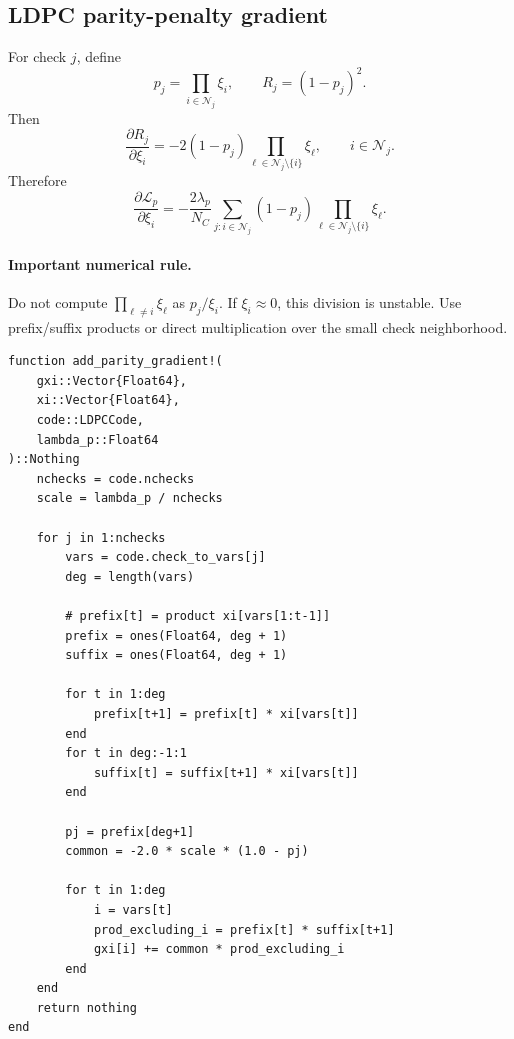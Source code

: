 \documentclass[11pt]{article}
\begin{document}
\subsection{LDPC parity-penalty gradient}

For check $j$, define
\begin{equation}
 p_j=\prod_{i\in\mathcal N_j}\xi_i,
\qquad
R_j=(1-p_j)^2.
\end{equation}
Then
\begin{equation}
\frac{\partial R_j}{\partial\xi_i}
= -2(1-p_j)\prod_{\ell\in\mathcal N_j\setminus\{i\}}\xi_\ell,
\qquad i\in\mathcal N_j.
\end{equation}
Therefore
\begin{equation}
\frac{\partial\mathcal L_p}{\partial\xi_i}
= -\frac{2\lambda_p}{N_C}
\sum_{j:i\in\mathcal N_j}
(1-p_j)
\prod_{\ell\in\mathcal N_j\setminus\{i\}}\xi_\ell.
\label{eq:grad_parity}
\end{equation}

\paragraph{Important numerical rule.}
Do not compute $\prod_{\ell\ne i}\xi_\ell$ as $p_j/\xi_i$.  If $\xi_i\approx0$, this division is unstable.  Use prefix/suffix products or direct multiplication over the small check neighborhood.

\begin{lstlisting}
function add_parity_gradient!(
    gxi::Vector{Float64},
    xi::Vector{Float64},
    code::LDPCCode,
    lambda_p::Float64
)::Nothing
    nchecks = code.nchecks
    scale = lambda_p / nchecks

    for j in 1:nchecks
        vars = code.check_to_vars[j]
        deg = length(vars)

        # prefix[t] = product xi[vars[1:t-1]]
        prefix = ones(Float64, deg + 1)
        suffix = ones(Float64, deg + 1)

        for t in 1:deg
            prefix[t+1] = prefix[t] * xi[vars[t]]
        end
        for t in deg:-1:1
            suffix[t] = suffix[t+1] * xi[vars[t]]
        end

        pj = prefix[deg+1]
        common = -2.0 * scale * (1.0 - pj)

        for t in 1:deg
            i = vars[t]
            prod_excluding_i = prefix[t] * suffix[t+1]
            gxi[i] += common * prod_excluding_i
        end
    end
    return nothing
end
\end{lstlisting}
\end{document}
